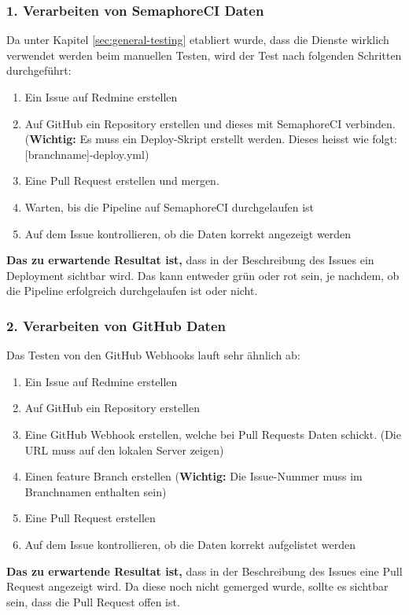 \subsubsection{1. Verarbeiten von SemaphoreCI Daten}
Da unter Kapitel \ref{sec:general-testing} etabliert wurde, dass die Dienste wirklich verwendet werden beim manuellen Testen,
wird der Test nach folgenden Schritten durchgeführt:
\begin{enumerate}
  \item Ein Issue auf Redmine erstellen
  \item Auf GitHub ein Repository erstellen und dieses mit SemaphoreCI verbinden. 
  (\textbf{Wichtig:} Es muss ein Deploy-Skript erstellt werden. Dieses heisst wie folgt:
  [branchname]-deploy.yml)
  \item Eine Pull Request erstellen und mergen.
  \item Warten, bis die Pipeline auf SemaphoreCI durchgelaufen ist
  \item Auf dem Issue kontrollieren, ob die Daten korrekt angezeigt werden
\end{enumerate}

\textbf{Das zu erwartende Resultat ist,} dass in der Beschreibung des Issues ein Deployment sichtbar wird. Das kann entweder grün oder rot
sein, je nachdem, ob die Pipeline erfolgreich durchgelaufen ist oder nicht.

\subsubsection{2. Verarbeiten von GitHub Daten}
\label{sec:github-testing}
Das Testen von den GitHub Webhooks lauft sehr ähnlich ab:
\begin{enumerate}
  \item Ein Issue auf Redmine erstellen
  \item Auf GitHub ein Repository erstellen
  \item Eine GitHub Webhook erstellen, welche bei Pull Requests Daten schickt. (Die URL muss auf den lokalen Server zeigen)
  \item Einen feature Branch erstellen (\textbf{Wichtig:} Die Issue-Nummer muss im Branchnamen enthalten sein)
  \item Eine Pull Request erstellen
  \item Auf dem Issue kontrollieren, ob die Daten korrekt aufgelistet werden
\end{enumerate}

\textbf{Das zu erwartende Resultat ist,} dass in der Beschreibung des Issues eine Pull Request angezeigt wird. Da diese noch nicht gemerged
wurde, sollte es sichtbar sein, dass die Pull Request offen ist.

